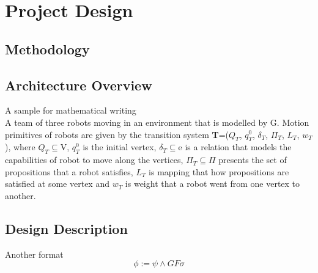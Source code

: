 
\chapter{Project Design} %

\label{Chapter3} %



\section{Methodology}


\section{Architecture Overview}

A sample for mathematical writing\\ 

A team of three robots moving in an environment that is modelled by G. Motion primitives of robots are given by the transition system \textbf{T}=($Q_T$, $q^0_T$, $\delta_T$, $\Pi_T$, $L_T$, $w_T$), where $Q_T$$\subseteq$V, $q^0_T$ is the initial vertex, $\delta_T$$\subseteq$e is a relation that models the capabilities of robot to move along the vertices, $\Pi_T$$\subseteq$$\Pi$ presents the set of propositions that a robot satisfies, $L_T$ is mapping that how propositions are satisfied at some vertex and $w_T$ is weight that a robot went from one vertex to another.

\section{Design Description}
Another format 
\begin{equation}
    \phi := \psi \wedge GF \sigma
\end{equation}



